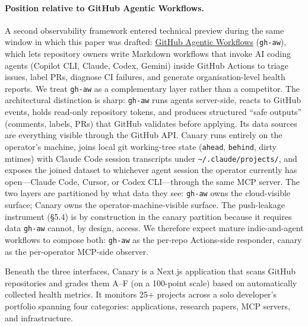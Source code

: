 \documentclass[12pt]{article}
\begin{document}
\paragraph{Position relative to GitHub Agentic Workflows.}
A second observability framework entered technical preview during the same window in which this paper was drafted: \href{https://github.github.com/gh-aw/}{GitHub Agentic Workflows} (\texttt{gh-aw}), which lets repository owners write Markdown workflows that invoke AI coding agents (Copilot CLI, Claude, Codex, Gemini) inside GitHub Actions to triage issues, label PRs, diagnose CI failures, and generate organisation-level health reports. We treat \texttt{gh-aw} as a complementary layer rather than a competitor. The architectural distinction is sharp: \texttt{gh-aw} runs agents server-side, reacts to GitHub events, holds read-only repository tokens, and produces structured ``safe outputs'' (comments, labels, PRs) that GitHub validates before applying. Its data sources are everything visible through the GitHub API. Canary runs entirely on the operator's machine, joins local git working-tree state (\texttt{ahead}, \texttt{behind}, dirty mtimes) with Claude Code session transcripts under \texttt{\textasciitilde/.claude/projects/}, and exposes the joined dataset to whichever agent session the operator currently has open---Claude Code, Cursor, or Codex CLI---through the same MCP server. The two layers are partitioned by what data they see: \texttt{gh-aw} owns the cloud-visible surface; Canary owns the operator-machine-visible surface. The push-leakage instrument (\S5.4) is by construction in the canary partition because it requires data \texttt{gh-aw} cannot, by design, access. We therefore expect mature indie-and-agent workflows to compose both: \texttt{gh-aw} as the per-repo Actions-side responder, canary as the per-operator MCP-side observer.


Beneath the three interfaces, Canary is a Next.js application that scans GitHub repositories and grades them A--F (on a 100-point scale) based on automatically collected health metrics. It monitors 25+ projects across a solo developer's portfolio spanning four categories: applications, research papers, MCP servers, and infrastructure.
\end{document}
